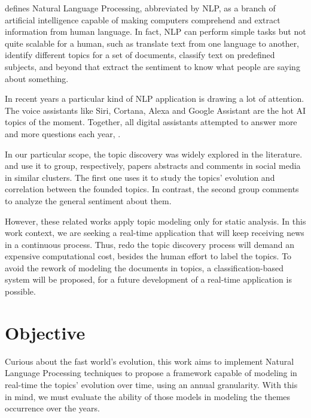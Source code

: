  defines Natural Language Processing, abbreviated by NLP, as a branch of artificial intelligence capable of making computers comprehend and extract information from human language.
In fact, NLP can perform simple tasks but not quite scalable for a human, such as translate text from one language to another, identify different topics for a set of documents, classify text on predefined subjects, and beyond that extract the sentiment to know what people are saying about something.

In recent years a particular kind of NLP application is drawing a lot of attention. The voice assistants like Siri, Cortana, Alexa and Google Assistant are the hot AI topics of the moment. Together, all digital assistants attempted to answer more and more questions each year, \cite{kailakrayewski2019}.

\newpage
In our particular scope, the topic discovery was widely explored in the literature.  and  use it to group, respectively, papers abstracts and comments in social media in similar clusters. The first one uses it to study the topics' evolution and correlation between the founded topics. In contrast, the second group comments to analyze the general sentiment about them.

However, these related works apply topic modeling only for static analysis. In this work context, we are seeking a real-time application that will keep receiving news in a continuous process. Thus, redo the topic discovery process will demand an expensive computational cost, besides the human effort to label the topics. To avoid the rework of modeling the documents in topics, a classification-based system will be proposed, for a future development of a real-time application is possible.


\section{Objective}


Curious about the fast world's evolution, this work aims to implement Natural Language Processing techniques to propose a framework capable of modeling in real-time the topics' evolution over time, using an annual granularity. 
With this in mind, we must evaluate the ability of those models in modeling the themes occurrence over the years.

